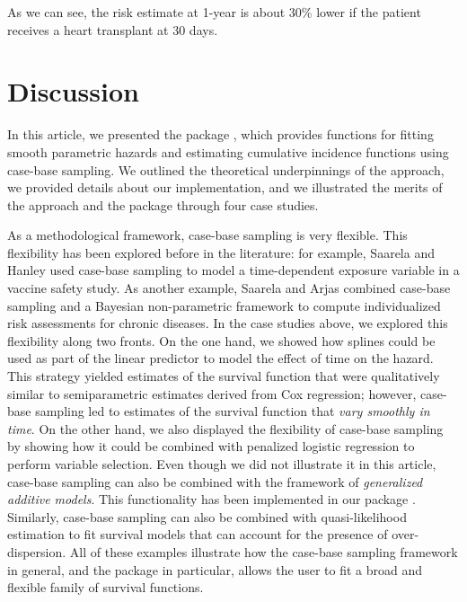 \documentclass[
]{jss}
\begin{document}
As we can see, the risk estimate at 1-year is about 30\% lower if the
patient receives a heart transplant at 30 days.

\hypertarget{discussion}{%
\section{Discussion}\label{discussion}}

In this article, we presented the  package ,
which provides functions for fitting smooth parametric hazards and
estimating cumulative incidence functions using case-base sampling. We
outlined the theoretical underpinnings of the approach, we provided
details about our implementation, and we illustrated the merits of the
approach and the package through four case studies.

As a methodological framework, case-base sampling is very flexible. This
flexibility has been explored before in the literature: for example,
Saarela and Hanley \citeyearpar{saarela2015case} used case-base sampling
to model a time-dependent exposure variable in a vaccine safety study.
As another example, Saarela and Arjas \citeyearpar{saarela2015non}
combined case-base sampling and a Bayesian non-parametric framework to
compute individualized risk assessments for chronic diseases. In the
case studies above, we explored this flexibility along two fronts. On
the one hand, we showed how splines could be used as part of the linear
predictor to model the effect of time on the hazard. This strategy
yielded estimates of the survival function that were qualitatively
similar to semiparametric estimates derived from Cox regression;
however, case-base sampling led to estimates of the survival function
that \emph{vary smoothly in time}. On the other hand, we also displayed
the flexibility of case-base sampling by showing how it could be
combined with penalized logistic regression to perform variable
selection. Even though we did not illustrate it in this article,
case-base sampling can also be combined with the framework of
\emph{generalized additive models}. This functionality has been
implemented in our package . Similarly, case-base sampling
can also be combined with quasi-likelihood estimation to fit survival
models that can account for the presence of over-dispersion. All of
these examples illustrate how the case-base sampling framework in
general, and the package  in particular, allows the user
to fit a broad and flexible family of survival functions.
\end{document}
